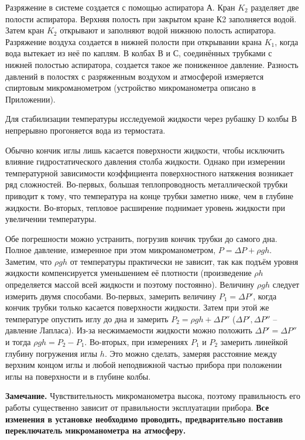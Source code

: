 \documentclass[a4paper,12pt]{article} %
\theoremstyle{plain} %
\theoremstyle{definition} %
\theoremstyle{remark} %
\begin{document}
Разряжение в системе создается с помощью аспиратора А. Кран $K_2$ разделяет две полости аспиратора. Верхняя полость при закрытом кране К2  заполняется водой. Затем кран $K_2$ открывают и заполняют водой  нижнюю полость  аспиратора.  Разряжение воздуха создается в нижней полости  при открывании крана $K_1$, когда  вода вытекает из неё по каплям. В колбах В и С, соединённых трубками с нижней полостью аспиратора,  создается такое же пониженное давление. Разность давлений в полостях с разряженным воздухом и атмосферой измеряется спиртовым микроманометром (устройство микроманометра описано в Приложении). 

Для стабилизации температуры исследуемой жидкости через рубашку D колбы В непрерывно прогоняется вода из термостата.

Обычно кончик иглы лишь касается поверхности жидкости, чтобы исключить влияние гидростатического давления столба жидкости. Однако при измерении температурной зависимости коэффициента поверхностного натяжения возникает ряд сложностей. Во-первых, большая теплопроводность металлической трубки приводит к тому, что температура на конце трубки заметно ниже, чем в глубине жидкости. Во-вторых, тепловое расширение поднимает уровень жидкости при увеличении температуры. 

Обе погрешности можно устранить, погрузив кончик трубки до самого дна. Полное давление, измеренное при этом микроманометром, $P = \Delta P + \rho gh$. Заметим, что $\rho gh$ от температуры практически не зависит, так как подъём уровня жидкости компенсируется уменьшением её плотности (произведение $\rho h$ определяется массой всей жидкости и поэтому постоянно). Величину  $\rho gh$ следует измерить двумя способами. Во-первых, замерить величину $P_1= \Delta P'$, когда кончик трубки только касается поверхности жидкости. Затем при этой же температуре опустить иглу до дна и замерить $P_2= \rho gh + \Delta P''$ ($\Delta P', \Delta P''$ – давление Лапласа). Из-за  несжимаемости  жидкости можно положить $\Delta P' = \Delta P''$ и тогда $\rho gh = P_2-P_1.$ Во-вторых, при измерениях $P_1$ и $P_2$ замерить линейкой  глубину погружения иглы $h$. Это можно сделать, замеряя расстояние между верхним концом иглы и любой неподвижной частью прибора при положении иглы на поверхности и в глубине колбы.

\textbf{Замечание.} Чувствительность микроманометра высока, поэтому правильность его работы существенно зависит от правильности  эксплуатации прибора. \textbf{Все изменения в установке необходимо проводить, предварительно поставив переключатель микроманометра на атмосферу.}
\end{document}
